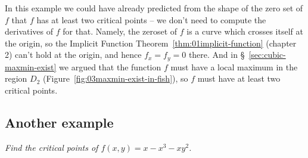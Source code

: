 In this example we could have already predicted from the shape of the zero
set of $f$ that $f$ has at least two critical points -- we don't need to
compute the derivatives of $f$ for that.  Namely, the zeroset of $f$ is a
curve which crosses itself at the origin, so the Implicit Function
Theorem~\ref{thm:01implicit-function} (chapter 2) can't hold at the origin,
and hence $f_x=f_y=0$ there.  And in \S~\ref{sec:cubic-maxmin-exist} we
argued that the function $f$ must have a local maximum in the region $D_2$
(Figure~\ref{fig:03maxmin-exist-in-fish}), so $f$ must have at least two
critical points.

\subsection{Another example} %
\textit{Find the critical points of $f(x,y) =x-x^3-xy^2$. }

